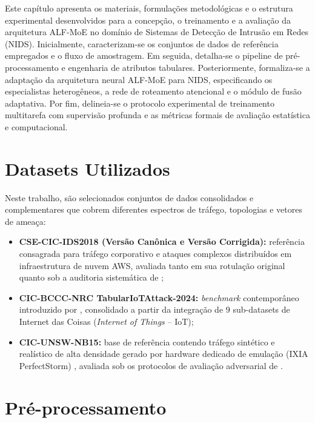 Este capítulo apresenta os materiais, formulações metodológicas e o estrutura experimental desenvolvidos para a 
concepção, o treinamento e a avaliação da arquitetura ALF-MoE no domínio de Sistemas de Detecção de Intrusão em Redes 
(NIDS). Inicialmente, caracterizam-se os conjuntos de dados de referência empregados e o fluxo de amostragem. Em 
seguida, detalha-se o pipeline de pré-processamento e engenharia de atributos tabulares. Posteriormente, formaliza-se a 
adaptação da arquitetura neural ALF-MoE para NIDS, especificando os especialistas heterogêneos, a rede de roteamento 
atencional e o módulo de fusão adaptativa. Por fim, delineia-se o protocolo experimental de treinamento multitarefa com 
supervisão profunda e as métricas formais de avaliação estatística e computacional.

\section{Datasets Utilizados}
\label{sec:datasets_utilizados}

Neste trabalho, são selecionados conjuntos de dados consolidados e complementares que cobrem diferentes espectros de 
tráfego, topologias e vetores de ameaça:
\begin{itemize}
    \item \textbf{CSE-CIC-IDS2018 (Versão Canônica e Versão Corrigida):} referência consagrada para tráfego corporativo
    e ataques complexos distribuídos em infraestrutura de nuvem AWS, avaliada tanto em sua rotulação original quanto sob
    a auditoria sistemática de ;
    \item \textbf{CIC-BCCC-NRC TabularIoTAttack-2024:} \emph{benchmark} contemporâneo introduzido por
    , consolidado a partir da integração de 9 sub-datasets de Internet das Coisas
    (\emph{Internet of Things} -- IoT);
    \item \textbf{CIC-UNSW-NB15:} base de referência contendo tráfego sintético e realístico de alta densidade gerado
    por hardware dedicado de emulação (IXIA PerfectStorm) \cite{moustafa2015unsw}, avaliada sob os protocolos de
    avaliação adversarial de .
\end{itemize}

\section{Pré-processamento}
\label{sec:pre-processamento}

